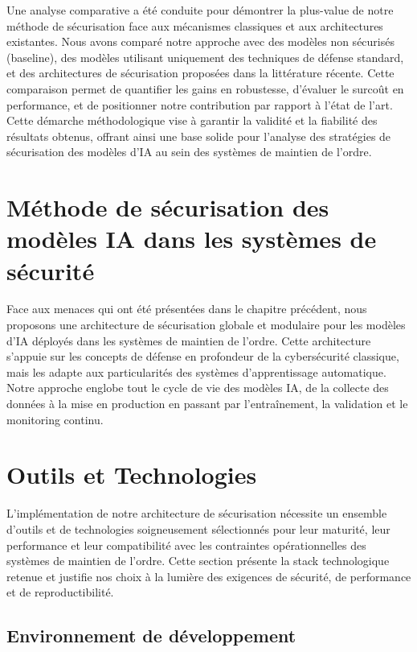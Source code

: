 Une analyse comparative a été conduite pour démontrer la plus-value de notre méthode de sécurisation face aux mécanismes classiques et aux architectures existantes. Nous avons comparé notre approche avec des modèles non sécurisés (baseline), des modèles utilisant uniquement des techniques de défense standard, et des architectures de sécurisation proposées dans la littérature récente. Cette comparaison permet de quantifier les gains en robustesse, d'évaluer le surcoût en performance, et de positionner notre contribution par rapport à l'état de l'art. Cette démarche méthodologique vise à garantir la validité et la fiabilité des résultats obtenus, offrant ainsi une base solide pour l'analyse des stratégies de sécurisation des modèles d'IA au sein des systèmes de maintien de l'ordre.

\section{Méthode de sécurisation des modèles IA dans les systèmes de sécurité}

Face aux menaces qui ont été présentées dans le chapitre précédent, nous proposons une architecture de sécurisation globale et modulaire pour les modèles d'IA déployés dans les systèmes de maintien de l'ordre. Cette architecture s'appuie sur les concepts de défense en profondeur de la cybersécurité classique, mais les adapte aux particularités des systèmes d'apprentissage automatique. Notre approche englobe tout le cycle de vie des modèles IA, de la collecte des données à la mise en production en passant par l'entraînement, la validation et le monitoring continu.

\section{Outils et Technologies}

L'implémentation de notre architecture de sécurisation nécessite un ensemble d'outils et de technologies soigneusement sélectionnés pour leur maturité, leur performance et leur compatibilité avec les contraintes opérationnelles des systèmes de maintien de l'ordre. Cette section présente la stack technologique retenue et justifie nos choix à la lumière des exigences de sécurité, de performance et de reproductibilité.

\subsection{Environnement de développement}

